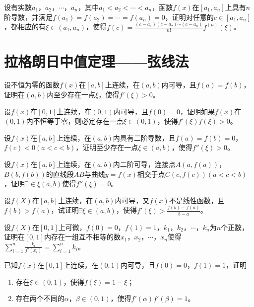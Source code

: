 \begin{example}
	设有实数$a_1$，$a_2$，$\cdots$，$a_n$，其中$a_1<a_2<\cdots<a_n$，函数$f(x)$在$[a_1,a_n]$上具有$n$阶导数，并满足$f(a_1)=f(a_2)=\cdots=f(a_n)=0$，证明对任意的$c\in[a_1,a_n]$，都相应的有$\xi\in(a_1,a_n)$，使得$f(c)=\frac{(c-a_1)(c-a_2)\cdots(c-a_n)}{n!}f^{(n)}(\xi)$。
\end{example}

\section{拉格朗日中值定理——弦线法}
\begin{example}
	设不恒为零的函数$f(x)$在$[a,b]$上连续，在$(a,b)$内可导，且$f(a)=f(b)$，证明在$(a,b)$内至少存在一点$\xi$，使得$f'(\xi)>0$。
\end{example}

\begin{example}
	设$f(x)$在$[0,1]$上连续，在$(0,1)$内可导，且$f(0)=0$，证明如果$f(x)$在$(0,1)$内不恒等于零，则必定存在一点$\xi\in(0,1)$，使得$f'(\xi)f(\xi)>0$。
\end{example}

\begin{example}
	设$f(x)$在$[a,b]$上连续，在$(a,b)$内具有二阶导数，且$f(a)=f(b)=0$，$f(c)<0(a<c<b)$，证明至少存在一点$\xi\in(a,b)$，使得$f''(\xi)>0$。
\end{example}

\begin{example}
	设$f(x)$在$[a,b]$上连续，在$(a,b)$内二阶可导，连接点$A(a,f(a))$，$B(b,f(b))$的直线段$AB$与曲线$y=f(x)$相交于点$C(c,f(c))(a<c<b)$，证明$\exists\in\xi(a,b)$使得$f''(\xi)=0$。
\end{example}

\begin{example}
	设$f(X)$在$[a,b]$上连续，在$(a,b)$内可导，又$f(x)$不是线性函数，且$f(b)>f(a)$，试证明$\exists\xi\in(a,b)$，使得$f'(\xi)>\frac{f(b)-f(a)}{b-a}$。
\end{example}

\begin{example}
	\color{red}设$f(X)$在$[0,1]$上可微，$f(0)=0$，$f(1)=1$，$k_1$，$k_2$，$\cdots$，$k_n$为$n$个正数，证明在$[0,1]$内存在一组互不相等的数$x_1$，$x_2$，$\cdots$，$x_n$使得$\sum_{i=1}^n\frac{k_i}{f'(x_i)}=\sum_{i=1}^nk_i$\color{black}。
\end{example}

\begin{example}
	\color{red}已知$f(x)$在$[0,1]$上连续，在$(0,1)$内可导，且$f(0)=0$，$f(1)=1$，证明
	\begin{enumerate}
		\item 存在$\xi\in(0,1)$，使得$f(\xi)=1-\xi$\color{black}；
		\color{red}\item 存在两个不同的$\alpha$，$\beta\in(0,1)$，使得$f'(\alpha)f'(\beta)=1$\color{black}。
	\end{enumerate}
\end{example}

